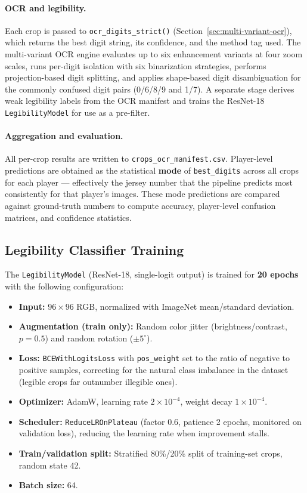 \paragraph{OCR and legibility.} Each crop is passed to
\texttt{ocr\_digits\_strict()} (Section~\ref{sec:multi-variant-ocr}),
which returns the best digit string, its confidence, and the method tag
used. The multi-variant OCR engine evaluates up to six enhancement
variants at four zoom scales, runs per-digit isolation with six
binarization strategies, performs projection-based digit splitting, and
applies shape-based digit disambiguation for the commonly confused digit
pairs (0/6/8/9 and 1/7). A separate stage derives weak legibility
labels from the OCR manifest and trains the ResNet-18
\texttt{LegibilityModel} for use as a pre-filter.

\paragraph{Aggregation and evaluation.} All per-crop results are
written to \texttt{crops\-\_ocr\-\_manifest.csv}. Player-level predictions
are obtained as the statistical \textbf{mode} of \texttt{best\-\_digits}
across all crops for each player --- effectively the jersey number that
the pipeline predicts most consistently for that player's images.
These mode predictions are compared against ground-truth numbers to
compute accuracy, player-level confusion matrices, and confidence
statistics.

\subsection{Legibility Classifier Training}
\label{sec:legibility-training}

The \texttt{LegibilityModel} (ResNet-18, single-logit output) is trained
for \textbf{20 epochs} with the following configuration:

\begin{itemize}[noitemsep]
    \item \textbf{Input:} $96 \times 96$ RGB, normalized with ImageNet
    mean/standard deviation.
    \item \textbf{Augmentation (train only):} Random color jitter
    (brightness/contrast, $p=0.5$) and random rotation ($\pm5^{\circ}$).
    \item \textbf{Loss:} \texttt{BCEWithLogitsLoss} with \texttt{pos\_weight}
    set to the ratio of negative to positive samples, correcting for
    the natural class imbalance in the dataset (legible crops far
    outnumber illegible ones).
    \item \textbf{Optimizer:} AdamW, learning rate $2\times10^{-4}$,
    weight decay $1\times10^{-4}$.
    \item \textbf{Scheduler:} \texttt{ReduceLROnPlateau} (factor 0.6,
    patience 2 epochs, monitored on validation loss), reducing the
    learning rate when improvement stalls.
    \item \textbf{Train/validation split:} Stratified 80\%/20\% split
    of training-set crops, random state 42.
    \item \textbf{Batch size:} 64.
\end{itemize}

